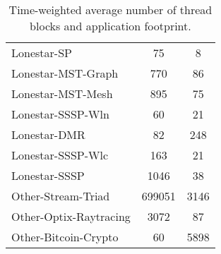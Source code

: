 \begin{table}[t]
\begin{small}
\begin{tabular}{lcc}
Lonestar-SP & 75 & 8 \\
Lonestar-MST-Graph & 770 & 86 \\
Lonestar-MST-Mesh & 895 & 75 \\
Lonestar-SSSP-Wln & 60 & 21 \\
Lonestar-DMR  & 82 & 248 \\
Lonestar-SSSP-Wlc  & 163 & 21 \\
Lonestar-SSSP  & 1046 & 38 \\
Other-Stream-Triad  & 699051 & 3146 \\
Other-Optix-Raytracing  & 3072 & 87 \\
Other-Bitcoin-Crypto  & 60 & 5898 \\
\toprule
\end{tabular}
\vspace{-.1in}
\caption{Time-weighted average number of thread blocks and application footprint.}
\vspace{-.2in}
\label{tab:numctas}
\end{small}
\end{table}


